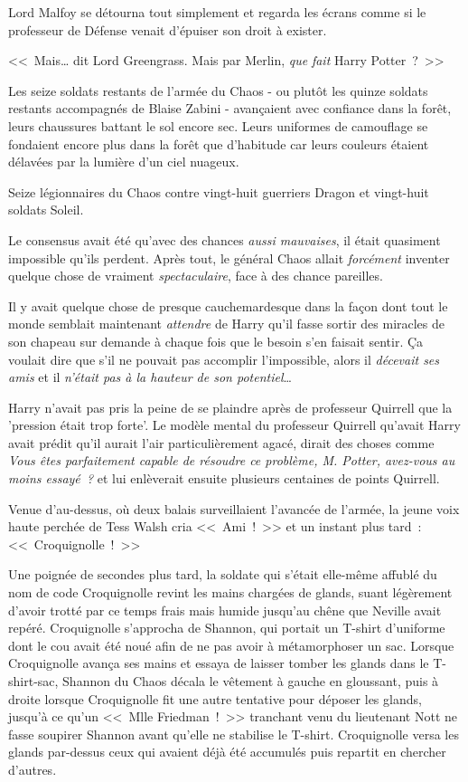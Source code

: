Lord Malfoy se détourna tout simplement et regarda les écrans comme si le professeur de Défense venait d'épuiser son droit à exister.

<<~Mais… dit Lord Greengrass. Mais par Merlin, \emph{que} \emph{fait} Harry Potter~?~>>

\later

Les seize soldats restants de l'armée du Chaos - ou plutôt les quinze soldats restants accompagnés de Blaise Zabini - avançaient avec confiance dans la forêt, leurs chaussures battant le sol encore sec. Leurs uniformes de camouflage se fondaient encore plus dans la forêt que d'habitude car leurs couleurs étaient délavées par la lumière d'un ciel nuageux.

Seize légionnaires du Chaos contre vingt-huit guerriers Dragon et vingt-huit soldats Soleil.

Le consensus avait été qu'avec des chances \emph{aussi mauvaises}, il était quasiment impossible qu'ils perdent. Après tout, le général Chaos allait \emph{forcément} inventer quelque chose de vraiment \emph{spectaculaire}, face à des chance pareilles.

Il y avait quelque chose de presque cauchemardesque dans la façon dont tout le monde semblait maintenant \emph{attendre} de Harry qu'il fasse sortir des miracles de son chapeau sur demande à chaque fois que le besoin s'en faisait sentir. Ça voulait dire que s'il ne pouvait pas accomplir l'impossible, alors il \emph{décevait ses amis} et il \emph{n'était pas à la hauteur de son potentiel}…

Harry n'avait pas pris la peine de se plaindre après de professeur Quirrell que la 'pression était trop forte'. Le modèle mental du professeur Quirrell qu'avait Harry avait prédit qu'il aurait l'air particulièrement agacé, dirait des choses comme \emph{Vous êtes parfaitement capable de résoudre ce problème, M. Potter, avez-vous au moins essayé~?} et lui enlèverait ensuite plusieurs centaines de points Quirrell.

Venue d'au-dessus, où deux balais surveillaient l'avancée de l'armée, la jeune voix haute perchée de Tess Walsh cria <<~Ami~!~>> et un instant plus tard~: <<~Croquignolle~!~>>

Une poignée de secondes plus tard, la soldate qui s'était elle-même affublé du nom de code Croquignolle revint les mains chargées de glands, suant légèrement d'avoir trotté par ce temps frais mais humide jusqu'au chêne que Neville avait repéré. Croquignolle s'approcha de Shannon, qui portait un T-shirt d'uniforme dont le cou avait été noué afin de ne pas avoir à métamorphoser un sac. Lorsque Croquignolle avança ses mains et essaya de laisser tomber les glands dans le T-shirt-sac, Shannon du Chaos décala le vêtement à gauche en gloussant, puis à droite lorsque Croquignolle fit une autre tentative pour déposer les glands, jusqu'à ce qu'un <<~Mlle Friedman~!~>> tranchant venu du lieutenant Nott ne fasse soupirer Shannon avant qu'elle ne stabilise le T-shirt. Croquignolle versa les glands par-dessus ceux qui avaient déjà été accumulés puis repartit en chercher d'autres.

